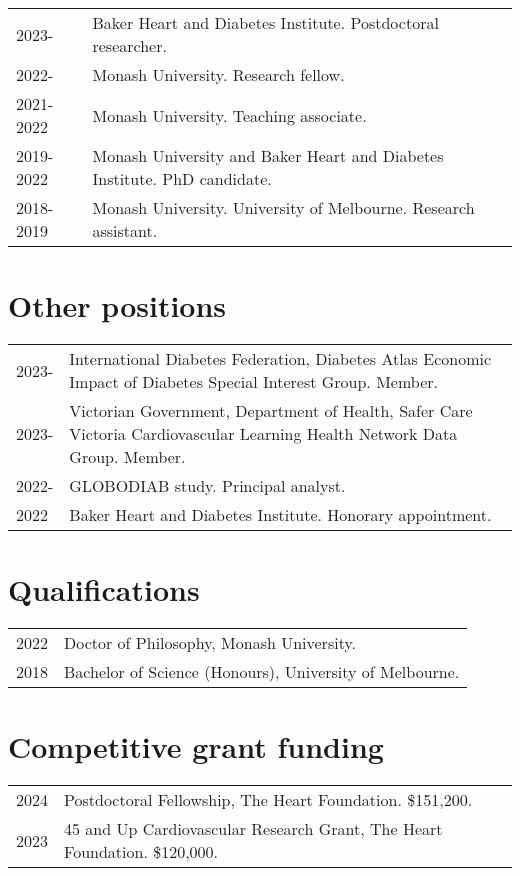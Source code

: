 \documentclass[11pt]{article}
\begin{document}
\begin{tabular}{p{2cm}p{14cm}}
2023- & Baker Heart and Diabetes Institute. Postdoctoral researcher. \\
2022- & Monash University. Research fellow. \\
2021-2022 & Monash University. Teaching associate. \\
2019-2022 & Monash University and Baker Heart and Diabetes Institute. PhD candidate. \\
2018-2019 & Monash University. University of Melbourne. Research assistant. \\
\end{tabular}

\section*{Other positions}
\begin{tabular}{p{2cm}p{14cm}}
2023- & International Diabetes Federation, Diabetes Atlas Economic Impact of Diabetes Special Interest Group. Member. \\
2023- & Victorian Government, Department of Health, 
Safer Care Victoria Cardiovascular Learning Health Network Data Group. Member. \\
2022- & GLOBODIAB study. Principal analyst.  \\
2022 & Baker Heart and Diabetes Institute. Honorary appointment.  \\
\end{tabular}

\section*{Qualifications}
\begin{tabular}{p{2cm}p{14cm}}
2022 & Doctor of Philosophy, Monash University. \\
2018 & Bachelor of Science (Honours), University of Melbourne. \\
\end{tabular}


\section*{Competitive grant funding}
\begin{tabular}{p{2cm}p{14cm}}
2024 & Postdoctoral Fellowship, The Heart Foundation. \$151,200. \\
2023 & 45 and Up Cardiovascular Research Grant, The Heart Foundation. \$120,000. \\
\end{tabular}
\end{document}
